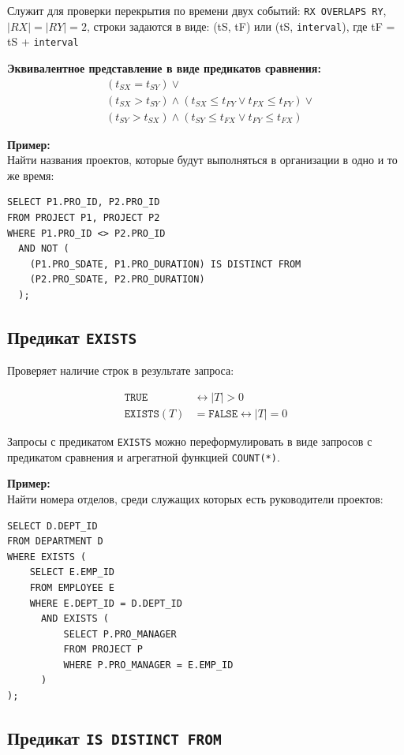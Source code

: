\documentclass[a4paper,12pt]{article}
\begin{document}
Служит для проверки перекрытия по времени двух событий: \texttt{RX OVERLAPS RY}, $|RX|=|RY|=2$, строки задаются в виде: (tS, tF) или (tS, \texttt{interval}), где tF = tS + \texttt{interval}

\textbf{Эквивалентное представление в виде предикатов сравнения:}
\[
\begin{aligned}
& ( t_{SX} = t_{SY} ) \lor \\
& ( t_{SX} > t_{SY} ) \land ( t_{SX} \leq t_{FY} \lor t_{FX} \leq t_{FY} ) \lor \\
& ( t_{SY} > t_{SX} ) \land ( t_{SY} \leq t_{FX} \lor t_{FY} \leq t_{FX} )
\end{aligned}
\]

\textbf{Пример:}\\
Найти названия проектов, которые будут выполняться в организации в одно и то же время:
\begin{lstlisting}
SELECT P1.PRO_ID, P2.PRO_ID 
FROM PROJECT P1, PROJECT P2 
WHERE P1.PRO_ID <> P2.PRO_ID 
  AND NOT (
    (P1.PRO_SDATE, P1.PRO_DURATION) IS DISTINCT FROM 
    (P2.PRO_SDATE, P2.PRO_DURATION)
  );
\end{lstlisting}

\subsection{Предикат \texttt{EXISTS}}

Проверяет наличие строк в результате запроса:

\[
\begin{aligned}
\texttt{TRUE} &\leftrightarrow |T| > 0 \\
\texttt{EXISTS}(T) &= \texttt{FALSE} \leftrightarrow |T| = 0
\end{aligned}
\]

Запросы с предикатом \texttt{EXISTS} можно переформулировать в виде запросов с предикатом сравнения и агрегатной функцией \texttt{COUNT(*)}.

\textbf{Пример:}\\
Найти номера отделов, среди служащих которых есть руководители проектов:
\begin{lstlisting}
SELECT D.DEPT_ID 
FROM DEPARTMENT D 
WHERE EXISTS (
    SELECT E.EMP_ID 
    FROM EMPLOYEE E 
    WHERE E.DEPT_ID = D.DEPT_ID 
      AND EXISTS (
          SELECT P.PRO_MANAGER 
          FROM PROJECT P 
          WHERE P.PRO_MANAGER = E.EMP_ID
      )
);
\end{lstlisting}

\subsection{Предикат \texttt{IS DISTINCT FROM}}
\end{document}
